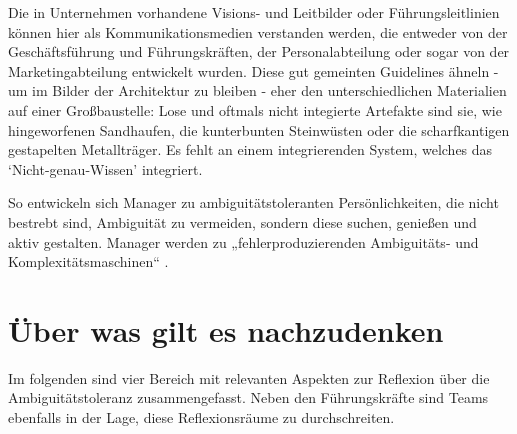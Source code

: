 \documentclass[
  ngerman,
  letterpaper,
  DIV=11]{scrartcl}
\begin{document}
Die in Unternehmen vorhandene Visions- und Leitbilder oder
Führungsleitlinien können hier als Kommunikationsmedien verstanden
werden, die entweder von der Geschäftsführung und Führungskräften, der
Personalabteilung oder sogar von der Marketingabteilung entwickelt
wurden. Diese gut gemeinten Guidelines ähneln - um im Bilder der
Architektur zu bleiben - eher den unterschiedlichen Materialien auf
einer Großbaustelle: Lose und oftmals nicht integierte Artefakte sind
sie, wie hingeworfenen Sandhaufen, die kunterbunten Steinwüsten oder die
scharfkantigen gestapelten Metallträger. Es fehlt an einem
integrierenden System, welches das `Nicht-genau-Wissen' integriert.

So entwickeln sich Manager zu ambiguitätstoleranten Persönlichkeiten,
die nicht bestrebt sind, Ambiguität zu vermeiden, sondern diese suchen,
genießen und aktiv gestalten. Manager werden zu „fehlerproduzierenden
Ambiguitäts- und Komplexitätsmaschinen`` \autocite{gutzmer2020}.

\section{Über was gilt es
nachzudenken}\label{uxfcber-was-gilt-es-nachzudenken}

Im folgenden sind vier Bereich mit relevanten Aspekten zur Reflexion
über die Ambiguitätstoleranz zusammengefasst. Neben den Führungskräfte
sind Teams ebenfalls in der Lage, diese Reflexionsräume zu
durchschreiten.
\end{document}
